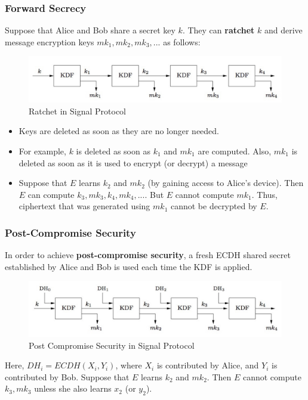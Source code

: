 \documentclass[12pt,titlepage]{article}
\begin{document}
\subsubsection{Forward Secrecy}
Suppose that Alice and Bob share a secret key $k$. They can \textbf{ratchet} $k$ and derive message encryption keys $mk_1 , mk_2 , mk_3, ...$ as follows:
\begin{center}
	\begin{figure}[h!]
		\centering
		\includegraphics[width=\textwidth]{Ratchet_in_Signal_Protocol.png}
		\caption{Ratchet in Signal Protocol}
	\end{figure}
\end{center}
\begin{itemize}
	\item Keys are deleted as soon as they are no longer needed.
	\item For example, $k$ is deleted as soon as $k_1$ and $mk_1$ are computed. Also, $mk_1$ is deleted as soon as it is used to encrypt (or decrypt) a message
	\item Suppose that $E$ learns $k_2$ and $mk_2$ (by gaining access to Alice’s device). Then $E$ can compute $k_3 , mk_3 , k_4 , mk_4 , ...$. But $E$ cannot compute $mk_1$. Thus, ciphertext that was generated using $mk_1$ cannot be decrypted by $E$.
\end{itemize}
\subsubsection{Post-Compromise Security}
In order to achieve \textbf{post-compromise security}, a fresh ECDH shared secret established by Alice and Bob is used each time the KDF is applied.
\begin{center}
	\begin{figure}[h!]
		\centering
		\includegraphics[width=\textwidth]{Post_Compromise_Security.png}
		\caption{Post Compromise Security in Signal Protocol}
	\end{figure}
\end{center}
Here, $DH_i = ECDH(X_i, Y_i)$, where $X_i$ is contributed by Alice, and $Y_i$ is contributed by Bob. Suppose that $E$ learns $k_2$ and $mk_2$. Then $E$ cannot compute $k_3, mk_3$ unless she also learns $x_2$ (or $y_2$).
\end{document}
